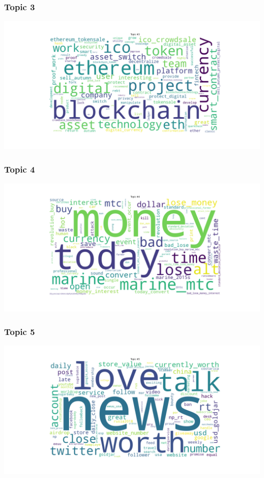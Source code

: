 \documentclass[
]{article}
\begin{document}
\hypertarget{topic-3}{%
\subsubsection{Topic 3}\label{topic-3}}

\includegraphics[width=7.8125in,height=\textheight]{images/03 - Topic_3.png}

\hypertarget{topic-4}{%
\subsubsection{Topic 4}\label{topic-4}}

\includegraphics[width=7.8125in,height=\textheight]{images/03 - Topic_4.png}

\hypertarget{topic-5}{%
\subsubsection{Topic 5}\label{topic-5}}

\includegraphics[width=7.8125in,height=\textheight]{images/03 - Topic_5.png}
\end{document}
